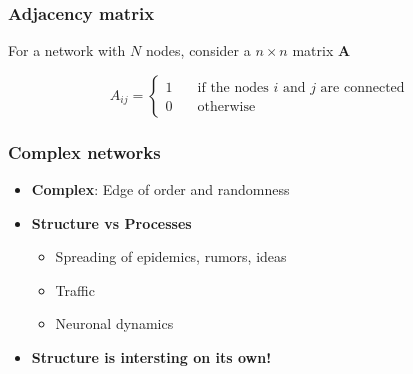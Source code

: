 \documentclass{beamer}
\begin{document}
\begin{frame}
    \frametitle{Adjacency matrix}
    \centering
    For a network with $N$ nodes, consider a $n\times n$ matrix ${\mathbf A}$

$$A_{ij} = \begin{cases}1 &\quad \text{if the nodes $i$ and $j$ are connected}\\0 &\quad \text{otherwise}\end{cases}$$

\end{frame}
\begin{frame}
    \frametitle{Complex networks}
    \begin{itemize}
    \setlength\itemsep{2em}
       \item{\Large {\bf Complex}: Edge of order and randomness}
        \pause
        \item{\Large {\bf Structure vs Processes}
            \begin{itemize}
            \setlength\itemsep{1em}
                \item{Spreading of epidemics, rumors, ideas}
                \item{Traffic}
                \item{Neuronal dynamics}
            \end{itemize}
        }
        \pause
        \item{\Large \bf Structure is intersting on its own!}
    \end{itemize}
\end{frame}
\end{document}

